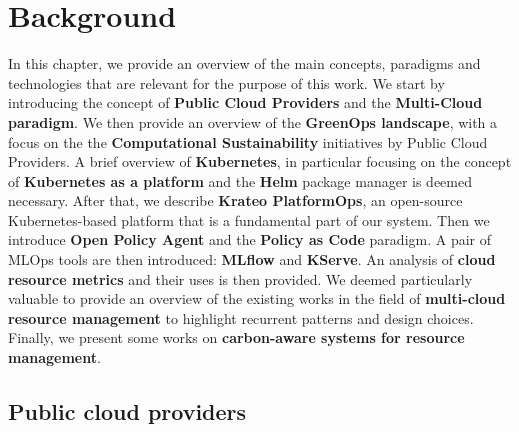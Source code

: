 \chapter{Background}
\label{cha:background}

In this chapter, we provide an overview of the main concepts, paradigms and technologies that are relevant for the purpose of this work.
We start by introducing the concept of \textbf{Public Cloud Providers} and the \textbf{Multi-Cloud paradigm}.
We then provide an overview of the \textbf{GreenOps landscape}, with a focus on the the \textbf{Computational Sustainability} initiatives by Public Cloud Providers.
A brief overview of \textbf{Kubernetes}, in particular focusing on the concept of \textbf{Kubernetes as a platform} and the \textbf{Helm} package manager is deemed necessary.
After that, we describe \textbf{Krateo PlatformOps}, an open-source Kubernetes-based platform that is a fundamental part of our system.
Then we introduce \textbf{Open Policy Agent} and the \textbf{Policy as Code} paradigm.
A pair of MLOps tools are then introduced: \textbf{MLflow} and \textbf{KServe}.
An analysis of \textbf{cloud resource metrics} and their uses is then provided.
We deemed particularly valuable to provide an overview of the existing works in the field of \textbf{multi-cloud resource management} to highlight recurrent patterns and design choices.
Finally, we present some works on \textbf{carbon-aware systems for resource management}. 

\section{Public cloud providers}

